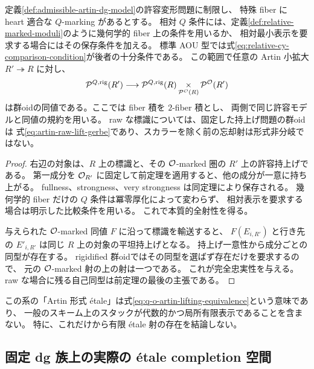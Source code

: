 \begin{corollary}
\label{cor:q-o-artin-formal-etale}
定義\ref{def:admissible-artin-dg-model}の許容変形問題に制限し、
特殊 fiber に heart 適合な $Q$-marking があるとする。
相対 $Q$ 条件には、定義\ref{def:relative-marked-moduli}のように幾何学的 fiber 上の条件を用いるか、
相対最小表示を要求する場合にはその保存条件を加える。
標準 AOU 型では式\eqref{eq:relative-cy-comparison-condition}が後者の十分条件である。
この範囲で任意の Artin 小拡大 $R'\twoheadrightarrow R$ に対し、
\begin{equation}\label{eq:q-o-artin-lifting-equivalence}
 \mathcal P^{Q,\mathrm{rig}}(R')\longrightarrow
 \mathcal P^{Q,\mathrm{rig}}(R)
 \mathop{\times}_{\mathcal P^{\mathcal O}(R)}\mathcal P^{\mathcal O}(R')
\end{equation}
は群oidの同値である。ここでは fiber 積を $2$-fiber 積とし、
両側で同じ許容モデルと同値の規約を用いる。
raw な標識については、固定した持上げ問題の群oidは
式\eqref{eq:artin-raw-lift-gerbe}であり、スカラーを除く前の忘却射は形式非分岐ではない。
\end{corollary}
\begin{proof}
右辺の対象は、$R$ 上の標識と、その $\mathcal O$-marked 圏の $R'$ 上の許容持上げである。
第一成分を $\mathcal O_{R'}$ に固定して前定理を適用すると、他の成分が一意に持ち上がる。
fullness、strongness、very strongness は同定理により保存される。
幾何学的 fiber だけの $Q$ 条件は冪零厚化によって変わらず、
相対表示を要求する場合は明示した比較条件を用いる。
これで本質的全射性を得る。

与えられた $\mathcal O$-marked 同値 $F$ に沿って標識を輸送すると、
$F(E_{i,R'})$ と行き先の $E'_{i,R'}$ は同じ $R$ 上の対象の平坦持上げとなる。
持上げ一意性から成分ごとの同型が存在する。
rigidified 群oidではその同型を選ばず存在だけを要求するので、
元の $\mathcal O$-marked 射の上の射は一つである。
これが完全忠実性を与える。
raw な場合に残る自己同型は前定理の最後の主張である。
\end{proof}

この系の「Artin 形式 \'etale」は式\eqref{eq:q-o-artin-lifting-equivalence}という意味であり、
一般のスキーム上のスタックが代数的かつ局所有限表示であることを含まない。
特に、これだけから有限 \'etale 射の存在を結論しない。

\subsection{固定 dg 族上の実際の \'etale completion 空間}

